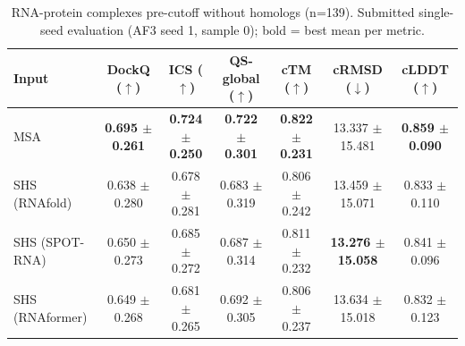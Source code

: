 \begin{table}[htbp]
\centering
\caption{RNA-protein complexes pre-cutoff without homologs (n=139). Submitted single-seed evaluation (AF3 seed 1, sample 0); bold = best mean per metric.}
\label{tab:rna_protein_complexes_pre_cutoff_without_homologs}
\begin{tabular}{lcccccc}
\toprule
Input & DockQ ($\uparrow$) & ICS ($\uparrow$) & QS-global ($\uparrow$) & cTM ($\uparrow$) & cRMSD ($\downarrow$) & cLDDT ($\uparrow$) \\
\midrule
MSA & \textbf{0.695 $\pm$ 0.261} & \textbf{0.724 $\pm$ 0.250} & \textbf{0.722 $\pm$ 0.301} & \textbf{0.822 $\pm$ 0.231} & 13.337 $\pm$ 15.481 & \textbf{0.859 $\pm$ 0.090} \\
SHS (RNAfold) & 0.638 $\pm$ 0.280 & 0.678 $\pm$ 0.281 & 0.683 $\pm$ 0.319 & 0.806 $\pm$ 0.242 & 13.459 $\pm$ 15.071 & 0.833 $\pm$ 0.110 \\
SHS (SPOT-RNA) & 0.650 $\pm$ 0.273 & 0.685 $\pm$ 0.272 & 0.687 $\pm$ 0.314 & 0.811 $\pm$ 0.232 & \textbf{13.276 $\pm$ 15.058} & 0.841 $\pm$ 0.096 \\
SHS (RNAformer) & 0.649 $\pm$ 0.268 & 0.681 $\pm$ 0.265 & 0.692 $\pm$ 0.305 & 0.806 $\pm$ 0.237 & 13.634 $\pm$ 15.018 & 0.832 $\pm$ 0.123 \\
\bottomrule
\end{tabular}
\end{table}
